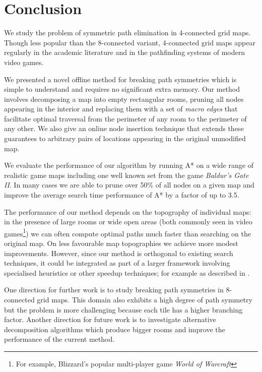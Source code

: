 \section{Conclusion}
We study the problem of symmetric path elimination in 4-connected grid maps.
Though less popular than the 8-connected variant, 4-connected grid maps appear 
regularly in the academic literature and in the pathfinding systems of modern
video games.
\par
We presented a novel offline method for breaking path symmetries which is simple
to understand and requires no significant extra memory. 
Our method involves decomposing a map into empty rectangular rooms, pruning all nodes
appearing in the interior and replacing them with a set of \emph{macro edges}
that facilitate optimal traversal from the perimeter of any room to the perimeter
of any other.
We also give an online node insertion technique that extends these guarantees
 to arbitrary pairs of locations appearing in the original unmodified map.
\par
We evaluate the performance of our algorithm by running A* on a wide
range of realistic game maps including one well known set from the game
\emph{Baldur's Gate II}. 
In many cases we are able to prune over 50\% of all nodes on a given map
and improve the average search time performance of A* by a factor of up to 3.5.
\par
The performance of our method depends on the topography of individual maps: 
in the presence of large rooms or wide open areas (both commonly seen in video games\footnote{For 
example, Blizzard's popular multi-player game \emph{World of Warcraft}})
we can often compute optimal paths much faster than searching on the original map. 
On less favourable map topographies we achieve more modest improvements.
However, since our method is orthogonal to existing search techniques, it could be integrated
as part of a larger framework involving specialised heuristics or other speedup techniques; 
for example as described in \cite{botea04,bjornsson05,bjornsson06}. 
\par
One direction for further work is to study breaking path symmetries
in 8-connected grid maps. 
This domain also exhibits a high degree of path symmetry but the problem is more
challenging because each tile has a higher branching factor. 
Another direction for future work is to investigate alternative decomposition
algorithms which produce bigger rooms and improve the performance of the current
method.
